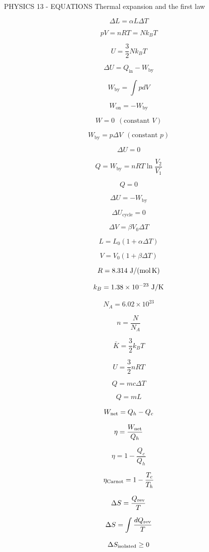 PHYSICS 13 - EQUATIONS
Thermal expansion and the first law

$$\Delta L = \alpha L \Delta T$$

$$pV = nRT = Nk_BT$$

$$U = \frac32 Nk_BT$$

$$\Delta U = Q_{\text{in}} - W_{\text{by}}$$

$$W_{\text{by}} = \int p dV$$

$$W_{\text{on}} = -W_{\text{by}}$$

$$W = 0\ \ (\text{constant } V)$$

$$W_{\text{by}} = p \Delta V\ \ (\text{constant } p)$$

$$\Delta U = 0$$

$$Q = W_{\text{by}} = nRT\ln\frac{V_2}{V_1}$$

$$Q = 0$$

$$\Delta U = -W_{\text{by}}$$

$$\Delta U_{\text{cycle}} = 0$$


$$\Delta V=\beta V_0\Delta T$$

$$L=L_0(1+\alpha\Delta T)$$

$$V=V_0(1+\beta\Delta T)$$

$$R=8.314\ \rm J/(mol\,K)$$

$$k_B=1.38\times10^{-23}\ \rm J/K$$

$$N_A=6.02\times10^{23}$$

$$n=\frac N{N_A}$$

$$\bar K=\frac32k_BT$$

$$U=\frac32nRT$$

$$Q=mc\Delta T$$

$$Q=mL$$

$$W_{\rm net}=Q_h-Q_c$$

$$\eta=\frac{W_{\rm net}}{Q_h}$$

$$\eta=1-\frac{Q_c}{Q_h}$$

$$\eta_{\rm Carnot}=1-\frac{T_c}{T_h}$$

$$\Delta S=\frac{Q_{\rm rev}}{T}$$

$$\Delta S=\int\frac{dQ_{\rm rev}}{T}$$

$$\Delta S_{\rm isolated}\ge0$$
